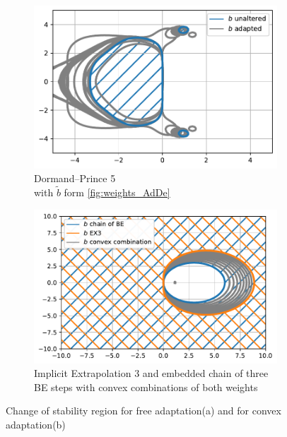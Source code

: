 \documentclass[a4paper]{article}
\numberwithin{equation}{section}
\theoremstyle{plain}
\theoremstyle{definition}
\numberwithin{theorem}{section}
\newcommand{\1}{\mathbbm{1}}
\begin{document}
\begin{figure}
     \centering
     \begin{subfigure}[b]{0.45\textwidth}
         \centering
         \includegraphics[width=\textwidth]{plots/stab_dp5.pdf}
         \caption{Dormand--Prince 5\\
         with $\tilde{b}$ form \ref{fig:weights_AdDe}
         }
         \label{fig:stab_ck5}
     \end{subfigure}
     \hfill
     \begin{subfigure}[b]{0.45\textwidth}
         \centering
         \includegraphics[width=\textwidth]{plots/stab_ex3.pdf}
         \caption{Implicit Extrapolation 3 and embedded chain of three BE steps with convex combinations of both weights}
         \label{fig:stab_ex3}
     \end{subfigure}
        \caption{Change of stability region for free adaptation(a) and for convex adaptation(b)}
        \label{fig:stab}
\end{figure}
\end{document}
